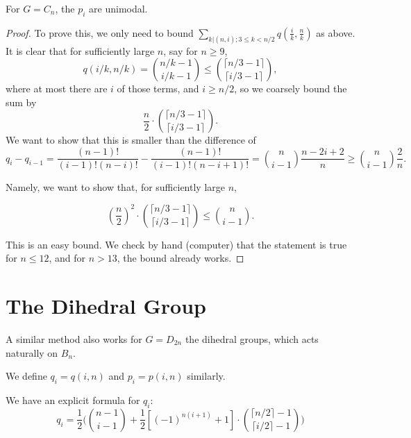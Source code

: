 \documentclass[12pt]{article}
\newcommand{\dstyle}{\displaystyle}
\newcommand{\1}{\mathbb{I}}
\theoremstyle{definition}
\theoremstyle{definition}
\theoremstyle{definition}
\theoremstyle{definition}
\theoremstyle{definition}
\theoremstyle{definition}
\begin{document}
\corollary For $G= C_n$, the $p_i$ are unimodal. 

\begin{proof}

To prove this, we only need to bound $ \dstyle \sum_{k | (n , i);  3 \le k < n/2 } q (\frac{i}{k}, \frac{n}{k}) $ as above. It is clear that for sufficiently large $n$, say for $n \ge 9$, $$q(i/k, n/k) = {n/k - 1 \choose i/k -1} \le {\lceil n/3-1 \rceil \choose \lceil i/3 -1 \rceil },$$ where at most there are $i$ of those terms, and $ i \ge n/2$, so we coarsely bound the sum by $$\frac{n}{2} \cdot {\lceil n/3-1 \rceil \choose \lceil i/3 -1 \rceil }. $$ We want to show that this is smaller than the difference of $$q_i - q_{i-1} = \frac{(n-1)!}{(i-1)! (n-i)!} - \frac{(n-1)!}{(i-1)!(n-i+1)!}= {n \choose i -1} \frac{n-2i +2}{n} \ge  {n \choose i -1} \frac{2}{n} .$$

Namely, we want to show that, for sufficiently large $n$, 

$$ (\frac{n}{2})^2 \cdot {\lceil n/3-1 \rceil \choose \lceil i/3 -1 \rceil }  \le   {n \choose i -1}.$$

This is an easy bound. We check by hand (computer) that the statement is true for $n \le 12$, and for $n > 13$, the bound already works.
\end{proof}


\newpage
\section{The Dihedral Group} \indent


A similar method also works for $G = D_{2n}$ the dihedral groups, which acts naturally on $B_n$. 

We define $q_i = q (i, n)$  and $p_i = p(i, n)$ similarly. 

\proposition We have an explicit formula for $q_i$: 
$$q_i = \frac{1}{2} \Big( {n-1 \choose i -1} + \frac{1}{2} [(-1)^{n(i+1)}+1] \cdot { \lceil n/2\rceil -1  \choose \lceil i/2 \rceil - 1}    \Big)$$
\end{document}

